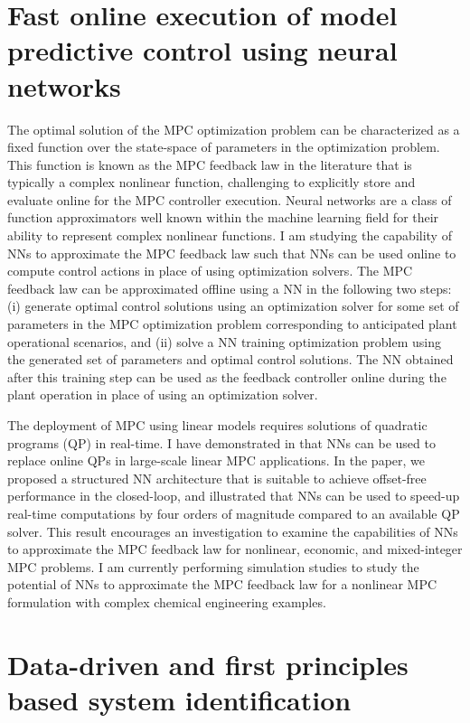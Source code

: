\documentclass[11pt, a4paper]{article} %
\begin{document}
\section*{Fast online execution of model predictive control using neural 
networks}

The optimal solution of the MPC optimization problem can be characterized as a 
fixed function over the state-space of parameters in the optimization problem. 
This function is known as the MPC feedback law in the literature 
\citep{bemporad:morari:dua:pistikopoulos:2002} that is typically a complex 
nonlinear function, challenging to explicitly 
store and evaluate online for the MPC controller execution. Neural networks are 
a class of function approximators well known within the machine learning field 
for their ability to represent complex nonlinear functions. I am studying the 
capability of NNs to approximate the MPC feedback law such that NNs can be used 
online to compute control actions in place of using optimization solvers. The 
MPC feedback law can be approximated offline using a NN in the following two 
steps: (i) generate optimal control solutions using an optimization solver 
for some set of parameters in the MPC optimization problem corresponding to 
anticipated plant operational scenarios, and (ii) solve a NN training 
optimization problem using the generated set of parameters and optimal control 
solutions. The NN obtained after this training step can be used as the feedback 
controller online during the plant operation in place of using an optimization 
solver.

The deployment of MPC using linear models requires solutions of quadratic 
programs (QP) in real-time. I have demonstrated in 
\cite*{kumar:rawlings:wright:2021} that NNs can be used to replace online QPs 
in large-scale linear MPC applications. In the paper, we proposed a structured 
NN architecture that is suitable to achieve offset-free performance in the 
closed-loop, and illustrated that NNs can be used to speed-up real-time 
computations by four orders of magnitude compared to an available QP solver. 
This result encourages an investigation to examine the capabilities of NNs to 
approximate the MPC feedback law for nonlinear, economic, and mixed-integer MPC 
problems. I am currently performing simulation studies to study the potential 
of NNs to approximate the MPC feedback law for a nonlinear MPC formulation with 
complex chemical engineering examples.

\section*{Data-driven and first principles based system identification}
\end{document}
